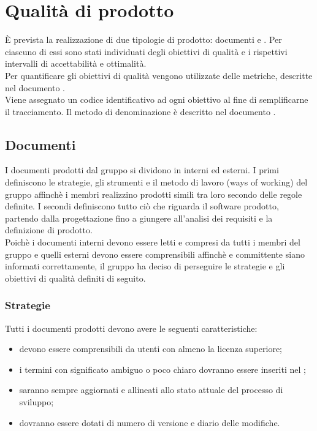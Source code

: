 \documentclass[PdQ.tex]{subfiles}
\begin{document}
\section{Qualità di prodotto}
	È prevista la realizzazione di due tipologie di prodotto: documenti e . Per ciascuno di essi sono stati individuati
	degli obiettivi di qualità e i rispettivi intervalli di accettabilità e ottimalità. \\
	Per quantificare gli obiettivi di qualità vengono utilizzate delle metriche, descritte nel documento \NPdocRP{}. \\
	Viene assegnato un codice identificativo ad ogni obiettivo al fine di semplificarne il tracciamento. Il metodo di denominazione
	è descritto nel documento \NPdocRP{}.

	\subsection{Documenti}
		I documenti prodotti dal gruppo \GRUPPO{} si dividono in interni ed esterni. I primi definiscono le strategie, gli strumenti e il metodo di lavoro (ways of working)
		del gruppo affinchè i membri realizzino prodotti simili tra loro secondo delle regole definite. I secondi definiscono tutto ciò che riguarda il software prodotto,
		partendo dalla progettazione fino a giungere all'analisi dei requisiti e la definizione di prodotto. \\
		Poichè i documenti interni devono essere letti e compresi da tutti i membri del gruppo e quelli esterni devono essere comprensibili affinchè  e committente
		siano informati correttamente, il gruppo ha deciso di perseguire le strategie e gli obiettivi di qualità definiti di seguito.

		\subsubsection{Strategie}
		Tutti i documenti prodotti devono avere le seguenti caratteristiche:
		\begin{itemize}
			\item devono essere comprensibili da utenti con almeno la licenza superiore;
			\item i termini con significato ambiguo o poco chiaro dovranno essere inseriti nel \Gldoc{};
			\item saranno sempre aggiornati e allineati allo stato attuale del processo di sviluppo;
			\item dovranno essere dotati di numero di versione e diario delle modifiche.
		\end{itemize}
\end{document}
